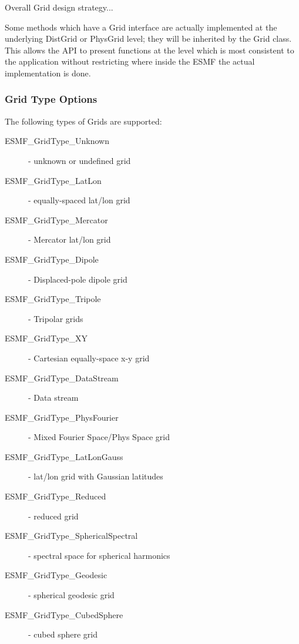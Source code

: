 

Overall Grid design strategy...

Some methods which have a Grid interface are actually implemented
at the underlying DistGrid or PhysGrid level; they will be inherited
by the Grid class.  This allows the API to present functions at the 
level which is most consistent to the application without restricting
where inside the ESMF the actual implementation is done.

\subsubsection{Grid Type Options}
The following types of Grids are supported:
\begin{description}
   \item[ESMF\_GridType\_Unknown] - unknown or undefined grid
   \item[ESMF\_GridType\_LatLon] - equally-spaced lat/lon grid
   \item[ESMF\_GridType\_Mercator] -  Mercator lat/lon grid
   \item[ESMF\_GridType\_Dipole] - Displaced-pole dipole grid
   \item[ESMF\_GridType\_Tripole] - Tripolar grids
   \item[ESMF\_GridType\_XY] - Cartesian equally-space x-y grid
   \item[ESMF\_GridType\_DataStream] - Data stream
   \item[ESMF\_GridType\_PhysFourier] - Mixed Fourier Space/Phys Space grid
   \item[ESMF\_GridType\_LatLonGauss] - lat/lon grid with Gaussian latitudes
   \item[ESMF\_GridType\_Reduced] - reduced grid
   \item[ESMF\_GridType\_SphericalSpectral] - spectral space for spherical harmonics
   \item[ESMF\_GridType\_Geodesic] - spherical geodesic grid
   \item[ESMF\_GridType\_CubedSphere] - cubed sphere grid
\end{description}


